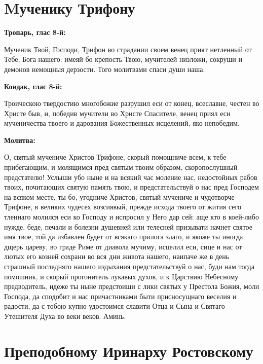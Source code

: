 \section{Mученику Трифону}
 


\bfseries Тропарь, глас 8-й:\normalfont{}


Мученик Твой, Господи, Трифон во страдании своем венец прият нетленный от Тебе, Бога нашего: имеяй бо крепость Твою, мучителей низложи, сокруши и демонов немощныя дерзости. Того молитвами спаси души наша.


\medskip


\bfseries Кондак, глас 8-й:\normalfont{}


Троическою твердостию многобожие разрушил еси от конец, всеславне, честен во Христе быв, и, победив мучители во Христе Спасителе, венец приял еси мученичества твоего и дарования Божественных исцелений, яко непобедим.


\medskip


\bfseries Молитва:\normalfont{}


О, святый мучениче Христов Трифоне, скорый помощниче всем, к тебе прибегающим, и молящимся пред святым твоим образом, скоропослушный предстателю! Услыши убо ныне и на всякий час моление нас, недостойных рабов твоих, почитающих святую память твою, и предстательствуй о нас пред Господем на всяком месте, ты бо, угодниче Христов, святый мучениче и чудотворче Трифоне, в великих чудесех возсиявый, прежде исхода твоего от жития сего тленнаго молился еси ко Господу и испросил у Него дар сей: аще кто в коей-либо нужде, беде, печали и болезни душевней или телесней призывати начнет святое имя твое, той да избавлен будет от всякаго прилога злаго, и якоже ты иногда дщерь цареву,  во граде Риме от диавола мучиму, исцелил еси, сице и нас от лютых его козней сохрани во вся дни живота нашего, наипаче же в день страшный последняго нашего издыхания предстательствуй о нас, буди нам тогда помошник, и скорый прогонитель лукавых духов, и к Царствию Небесному предводитель, идеже ты ныне предстоиши с лики святых у Престола Божия, моли Господа, да сподобит и нас причастниками быти присносущнаго веселия и радости, да с тобою купно удостоимся славити Отца и Сына и Святаго Утешителя Духа во веки веков. Аминь.


\section{Преподобному Иринарху Ростовскому}
 


